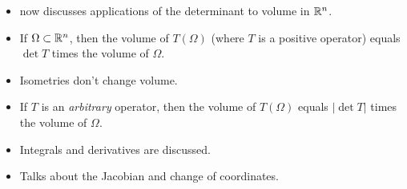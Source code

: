 \documentclass[../main.tex]{subfiles}
\begin{document}
\begin{itemize}
\begin{theorem}
    \end{theorem}
    \item \textcite{bib:Axler} now discusses applications of the determinant to volume in $\mathbb{R}^n$.
    \item If $\Omega\subset\mathbb{R}^n$, then the volume of $T(\Omega)$ (where $T$ is a positive operator) equals $\det T$ times the volume of $\Omega$.
    \item Isometries don't change volume.
    \item If $T$ is an \emph{arbitrary} operator, then the volume of $T(\Omega)$ equals $|\det T|$ times the volume of $\Omega$.
    \item Integrals and derivatives are discussed.
    \item Talks about the Jacobian and change of coordinates.
\end{itemize}
\end{document}
